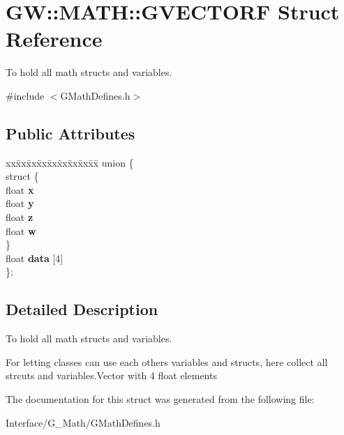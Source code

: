 \hypertarget{structGW_1_1MATH_1_1GVECTORF}{}\section{GW\+:\+:M\+A\+TH\+:\+:G\+V\+E\+C\+T\+O\+RF Struct Reference}
\label{structGW_1_1MATH_1_1GVECTORF}


To hold all math structs and variables.  




{\ttfamily \#include $<$G\+Math\+Defines.\+h$>$}

\subsection*{Public Attributes}
\begin{DoxyCompactItemize}
\item 
\mbox{\label{structGW_1_1MATH_1_1GVECTORF_a38acd9d2b655a4357b2430d20e50f31e}} 
\begin{tabbing}
xx\=xx\=xx\=xx\=xx\=xx\=xx\=xx\=xx\=\kill
union \{\\
\mbox{\label{unionGW_1_1MATH_1_1GVECTORF_1_1_0D4_a8671179b6484d5fa64dc13ba474fa3a8}} 
\>struct \{\\
\>\>float {\bfseries x}\\
\>\>float {\bfseries y}\\
\>\>float {\bfseries z}\\
\>\>float {\bfseries w}\\
\>\} \\
\>float {\bfseries data} \mbox{[}4\mbox{]}\\
\}; \\

\end{tabbing}\end{DoxyCompactItemize}


\subsection{Detailed Description}
To hold all math structs and variables. 

For letting classes can use each others variables and structs, here collect all strcuts and variables.\+Vector with 4 float elements 

The documentation for this struct was generated from the following file\+:\begin{DoxyCompactItemize}
\item 
Interface/\+G\+\_\+\+Math/G\+Math\+Defines.\+h\end{DoxyCompactItemize}
